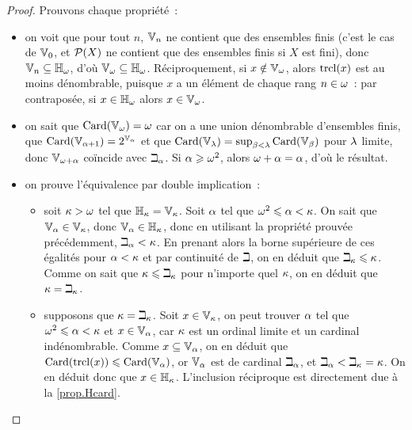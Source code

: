 \begin{proof}
  Prouvons chaque propriété~:
  \begin{itemize}
  \item on voit que pour tout $n$, $\mathbb V_n$ ne contient que des ensembles finis
    (c'est le cas de $\mathbb V_0$, et $\mathcal{P}(X)$ ne contient que des ensembles
    finis si $X$ est fini), donc $\mathbb V_n \subseteq \mathbb H_\omega$, d'où
    $\mathbb V_\omega \subseteq \mathbb H_\omega$. Réciproquement, si $x \notin \mathbb V_\omega$, alors
    $\operatorname{trcl}(x)$ est au moins dénombrable, puisque $x$ a un élément de chaque
    rang $n \in \omega$~: par contraposée, si $x\in \mathbb H_\omega$ alors $x\in \mathbb V_\omega$.
  \item on sait que $\operatorname{Card}(\mathbb V_\omega) = \omega$ car on a une union dénombrable
    d'ensembles finis, que $\operatorname{Card}(\mathbb V_{\alpha + 1}) = 2^{\mathbb V_\alpha}$ et que
    $\operatorname{Card}(\mathbb V_\lambda) = \sup_{\beta < \lambda} \operatorname{Card}(\mathbb V_\beta)$ pour
    $\lambda$ limite, donc $\mathbb V_{\omega + \alpha}$ coïncide avec $\beth_\alpha$. Si
    $\alpha \geqslant \omega^2$, alors $\omega + \alpha = \alpha$, d'où le résultat.
  \item on prouve l'équivalence par double implication~:
    \begin{itemize}
    \item soit $\kappa > \omega$ tel que $\mathbb H_\kappa = \mathbb V_\kappa$.
      Soit $\alpha$ tel que $\omega^2\leqslant \alpha < \kappa$. On sait que
      $\mathbb V_{\alpha} \in \mathbb V_\kappa$, donc $\mathbb V_{\alpha} \in \mathbb H_\kappa$, donc en utilisant la
      propriété prouvée précédemment, $\beth_\alpha < \kappa$. En prenant alors la
      borne supérieure de ces égalités pour $\alpha < \kappa$ et par continuité
      de $\beth$, on en déduit que $\beth_\kappa \leqslant \kappa$. Comme on sait que
      $\kappa \leqslant \beth_\kappa$ pour n'importe quel $\kappa$, on en déduit que
      $\kappa = \beth_\kappa$.
    \item supposons que $\kappa = \beth_\kappa$. Soit $x \in \mathbb V_\kappa$,
      on peut trouver $\alpha$ tel que $\omega^2\leqslant \alpha < \kappa$ et
      $x \in \mathbb V_\alpha$, car $\kappa$ est un ordinal limite et un cardinal
      indénombrable. Comme $x \subseteq \mathbb V_\alpha$, on en déduit que
      $\operatorname{Card}(\operatorname{trcl}(x)) \leqslant \operatorname{Card}(\mathbb V_{\alpha})$, or $\mathbb V_{\alpha}$ est
      de cardinal $\beth_\alpha$, et $\beth_\alpha < \beth_\kappa = \kappa$. On en
      déduit donc que $x \in \mathbb H_\kappa$. L'inclusion réciproque est directement
      due à la \cref{prop.Hcard}.\qedhere
    \end{itemize}
  \end{itemize}
\end{proof}

